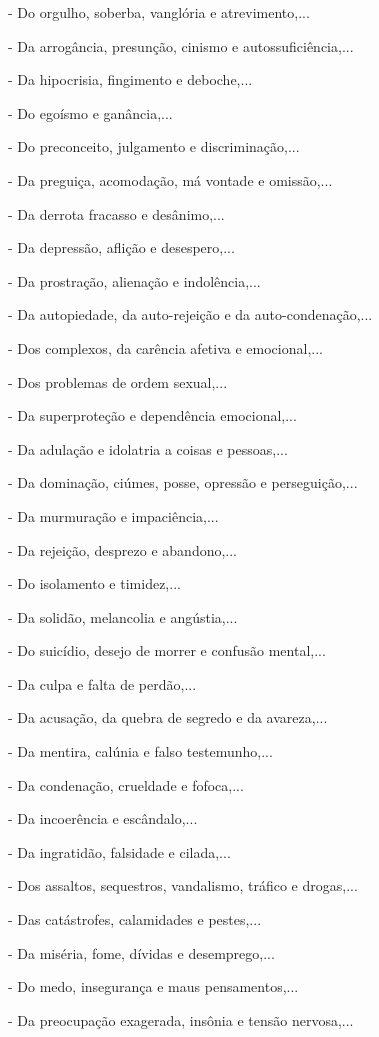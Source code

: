 \documentclass[a4paper,14pt]{extarticle} \usepackage[utf8]{inputenc}
\begin{document}
- Do orgulho, soberba, vanglória e atrevimento,...

- Da arrogância, presunção, cinismo e autossuficiência,...

- Da hipocrisia, fingimento e deboche,...

- Do egoísmo e ganância,...

- Do preconceito, julgamento e discriminação,...

- Da preguiça, acomodação, má vontade e omissão,...

- Da derrota fracasso e desânimo,... 

- Da depressão, aflição e desespero,...

- Da prostração, alienação e indolência,...

- Da autopiedade, da auto-rejeição e da auto-condenação,...

- Dos complexos, da carência afetiva e emocional,...

- Dos problemas de ordem sexual,...

- Da superproteção e dependência emocional,...

- Da adulação e idolatria a coisas e pessoas,...

- Da dominação, ciúmes, posse, opressão e perseguição,...

- Da murmuração e impaciência,...

- Da rejeição, desprezo e abandono,... 

- Do isolamento e timidez,...

- Da solidão, melancolia e angústia,...

- Do suicídio, desejo de morrer e confusão mental,...

- Da culpa e falta de perdão,...

- Da acusação, da quebra de segredo e da avareza,...

- Da mentira, calúnia e falso testemunho,...

- Da condenação, crueldade e fofoca,...

- Da incoerência e escândalo,...

- Da ingratidão, falsidade e cilada,...

- Dos assaltos, sequestros, vandalismo, tráfico e drogas,...

- Das catástrofes, calamidades e pestes,...

- Da miséria, fome, dívidas e desemprego,...

- Do medo, insegurança e maus pensamentos,...

- Da preocupação exagerada, insônia e tensão nervosa,...
\end{document}

